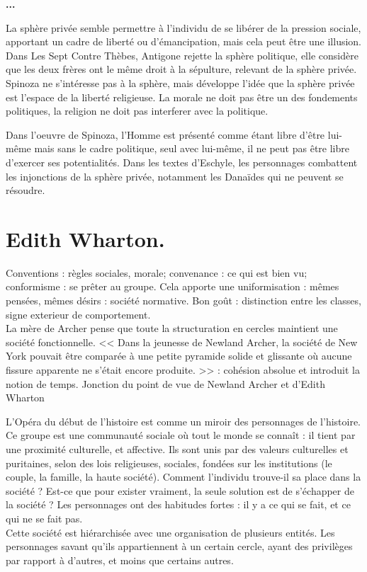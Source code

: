 \documentclass[11pt]{article}
\begin{document}
\bf{...}

La sphère privée semble permettre à l'individu de se libérer de la pression sociale, apportant un cadre de liberté ou d'émancipation, mais cela peut être une illusion.
Dans Les Sept Contre Thèbes, Antigone rejette la sphère politique, elle considère que les deux frères ont le même droit à la sépulture, relevant de la sphère privée. 
Spinoza ne s'intéresse pas à la sphère, mais développe l'idée que la sphère privée est l'espace de la liberté religieuse. 
La morale ne doit pas être un des fondements politiques, la religion ne doit pas interferer avec la politique.

Dans l'oeuvre de Spinoza, l'Homme est présenté comme étant libre d'être lui-même mais sans le cadre politique, seul avec lui-même, il ne peut pas être libre d'exercer ses potentialités. Dans les textes d'Eschyle, les personnages combattent les injonctions de la sphère privée, notamment les Danaïdes qui ne peuvent se résoudre.

\section{Edith Wharton.}

Conventions : règles sociales, morale; convenance : ce qui est bien vu; conformisme : se prêter au groupe. Cela apporte une uniformisation : mêmes pensées, mêmes désirs : société normative.
Bon goût : distinction entre les classes, signe exterieur de comportement.\\
La mère de Archer pense que toute la structuration en cercles maintient une société fonctionnelle.
<< Dans la jeunesse de Newland Archer, la société de New York pouvait être comparée à une petite pyramide solide et glissante où aucune fissure apparente ne s'était encore produite. >> : cohésion absolue et introduit la notion de temps.
Jonction du point de vue de Newland Archer et d'Edith Wharton 

L'Opéra du début de l'histoire est comme un miroir des personnages de l'histoire. Ce groupe est une communauté sociale où tout le monde se connaît : il tient par une proximité culturelle, et affective. Ils sont unis par des valeurs culturelles et puritaines, selon des lois religieuses, sociales, fondées sur les institutions (le couple, la famille, la haute société). Comment l'individu trouve-il sa place dans la société ? Est-ce que pour exister vraiment, la seule solution est de s'échapper de la société ? Les personnages ont des habitudes fortes : il y a ce qui se fait, et ce qui ne se fait pas.\\
Cette société est hiérarchisée avec une organisation de plusieurs entités. Les personnages savant qu'ils appartiennent à un certain cercle, ayant des privilèges par rapport à d'autres, et moins que certains autres.
\end{document}
